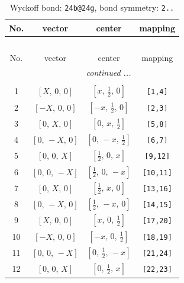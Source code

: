 \documentclass[fleqn,8pt]{jsarticle}
\begin{document}
\renewcommand{\arraystretch}{1.2}
\begin{longtable}{cccc}
\caption{Wyckoff bond: {\tt 24b@24g}, bond symmetry: {\tt 2..}}
 \\
 \hline \hline
No. & vector & center & mapping \\ \hline \endfirsthead

\multicolumn{3}{l}{\tablename\ \thetable{}} \\
 \hline \hline
No. & vector & center & mapping \\ \hline \endhead

 \hline \hline
\multicolumn{3}{r}{\footnotesize\it continued ...} \\ \endfoot

 \hline \hline
\multicolumn{3}{r}{} \\ \endlastfoot

1 & $\left[ X,\, 0,\, 0 \right]$ & $\left[ x,\, \frac{1}{2},\, 0 \right]$ & {\tt [1,4]} \\ \hline
2 & $\left[ - X,\, 0,\, 0 \right]$ & $\left[ - x,\, \frac{1}{2},\, 0 \right]$ & {\tt [2,3]} \\ \hline
3 & $\left[ 0,\, X,\, 0 \right]$ & $\left[ 0,\, x,\, \frac{1}{2} \right]$ & {\tt [5,8]} \\ \hline
4 & $\left[ 0,\, - X,\, 0 \right]$ & $\left[ 0,\, - x,\, \frac{1}{2} \right]$ & {\tt [6,7]} \\ \hline
5 & $\left[ 0,\, 0,\, X \right]$ & $\left[ \frac{1}{2},\, 0,\, x \right]$ & {\tt [9,12]} \\ \hline
6 & $\left[ 0,\, 0,\, - X \right]$ & $\left[ \frac{1}{2},\, 0,\, - x \right]$ & {\tt [10,11]} \\ \hline
7 & $\left[ 0,\, X,\, 0 \right]$ & $\left[ \frac{1}{2},\, x,\, 0 \right]$ & {\tt [13,16]} \\ \hline
8 & $\left[ 0,\, - X,\, 0 \right]$ & $\left[ \frac{1}{2},\, - x,\, 0 \right]$ & {\tt [14,15]} \\ \hline
9 & $\left[ X,\, 0,\, 0 \right]$ & $\left[ x,\, 0,\, \frac{1}{2} \right]$ & {\tt [17,20]} \\ \hline
10 & $\left[ - X,\, 0,\, 0 \right]$ & $\left[ - x,\, 0,\, \frac{1}{2} \right]$ & {\tt [18,19]} \\ \hline
11 & $\left[ 0,\, 0,\, - X \right]$ & $\left[ 0,\, \frac{1}{2},\, - x \right]$ & {\tt [21,24]} \\ \hline
12 & $\left[ 0,\, 0,\, X \right]$ & $\left[ 0,\, \frac{1}{2},\, x \right]$ & {\tt [22,23]} \\
\end{longtable}
\end{document}
